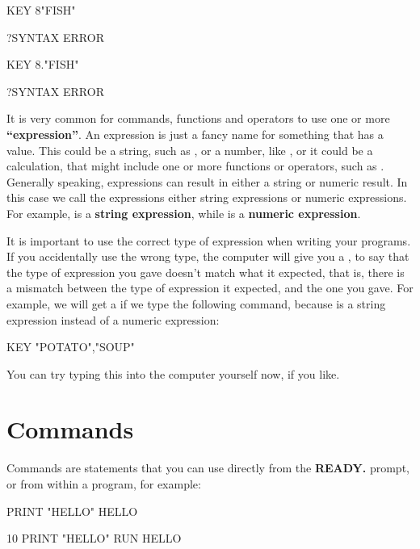 \begin{screenoutput}
KEY 8"FISH"

?SYNTAX ERROR

KEY 8."FISH"

?SYNTAX ERROR
\end{screenoutput}

It is very common for commands, functions and operators to use one or more {\bf``expression''}.
An expression is just a fancy name for something that has a value.
This could be a string, such as , or a number, like , or it could be a calculation, that might include
one or more functions or operators, such as .
Generally speaking, expressions can result in either a string or numeric result.
In this case we call the expressions either string expressions or numeric expressions.
For example,  is a {\bf string expression}, while  is a {\bf numeric expression}.

It is important to use the correct type of expression when writing your programs.
If you accidentally use the wrong type, the computer will give you a , to say that the type
of expression you gave doesn't match what it expected, that is, there is a mismatch between the type of expression
it expected, and the one you gave.  For example, we will get a  if we type the following command,
because  is a string expression instead of a numeric expression:

\begin{screenoutput}
  KEY "POTATO","SOUP"
\end{screenoutput}

You can try typing this into the computer yourself now, if you like.


\section{Commands}

Commands are statements that you can use directly from the {\bf READY.} prompt, or from within a program, for example:

\begin{screenoutput}
  PRINT "HELLO"
  HELLO

  10 PRINT "HELLO"
  RUN
  HELLO
\end{screenoutput}


